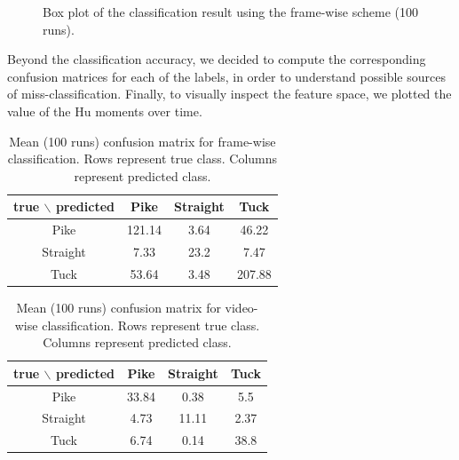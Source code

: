 \documentclass[a4paper, textwidth=18cm, textheight=24cm, top=1cm, bottom=1cm, left=1cm, right=1cm10pt]{article}
\begin{document}
\begin{figure}[!htb]
\caption{\label{fig:box_class} Box plot of the classification result using the frame-wise scheme (100 runs).}
\end{figure}

Beyond the classification accuracy, we decided to compute the corresponding confusion matrices for each of the labels, in order to understand possible sources of miss-classification. Finally, to visually inspect the feature space, we plotted the value of the Hu moments over time.

\begin{table}[!htb]
    \centering
    \begin{tabular}{c|c|c|c}
         true $\backslash$ predicted & Pike & Straight & Tuck\\
         \hline \hline
         Pike&    121.14&    3.64&  46.22\\
         \hline
         Straight&  7.33&  23.2&   7.47\\
         \hline
          Tuck&    53.64&    3.48& 207.88
    \end{tabular}
    \caption{Mean (100 runs) confusion matrix for frame-wise classification. Rows represent true class. Columns represent predicted class.}
    \label{tab:confusion_matrix_frame}
\end{table}

\begin{table}[!htb]
    \centering
    \begin{tabular}{c|c|c|c}
         true $\backslash$ predicted & Pike & Straight & Tuck\\
         \hline \hline
         Pike&    33.84&    0.38&  5.5\\
         \hline
         Straight&  4.73&  11.11&   2.37\\
         \hline
          Tuck&    6.74&    0.14& 38.8
          
    \end{tabular}
    \caption{Mean (100 runs) confusion matrix for video-wise classification. Rows represent true class. Columns represent predicted class.}
    \label{tab:confusion_matrix_video}
\end{table}
\end{document}
